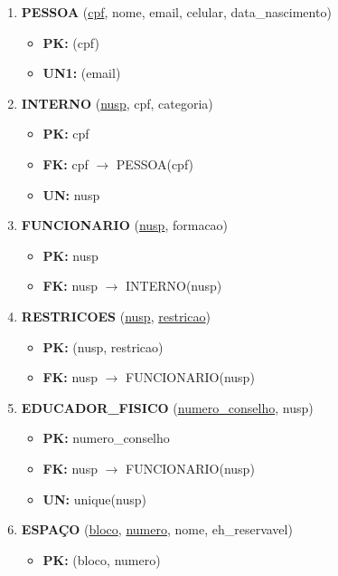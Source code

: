 \documentclass{article}
\begin{document}
\begin{enumerate}
    \item \textbf{PESSOA} (\underline{cpf}, nome, email, celular, data\_nascimento)
        \begin{itemize}
            \item \textbf{PK:} (cpf)
            \item \textbf{UN1:} (email)
        \end{itemize}

    \item \textbf{INTERNO} (\underline{nusp}, cpf, categoria)
        \begin{itemize}
            \item \textbf{PK:} cpf
            \item \textbf{FK:} cpf $\rightarrow$ PESSOA(cpf)
            \item \textbf{UN:} nusp
        \end{itemize}

    \item \textbf{FUNCIONARIO} (\underline{nusp}, formacao)
        \begin{itemize}
            \item \textbf{PK:} nusp
            \item \textbf{FK:} nusp $\rightarrow$ INTERNO(nusp)
        \end{itemize}
        
    \item \textbf{RESTRICOES} (\underline{nusp}, \underline{restricao})
        \begin{itemize}
            \item \textbf{PK:} (nusp, restricao)
            \item \textbf{FK:} nusp $\rightarrow$ FUNCIONARIO(nusp)
        \end{itemize}

    \item \textbf{EDUCADOR\_FISICO} (\underline{numero\_conselho}, nusp)
        \begin{itemize}
            \item \textbf{PK:} numero\_conselho
            \item \textbf{FK:} nusp $\rightarrow$ FUNCIONARIO(nusp)
            \item \textbf{UN:} unique(nusp)
        \end{itemize}

    \item \textbf{ESPAÇO} (\underline{bloco}, \underline{numero}, nome, eh\_reservavel)
        \begin{itemize}
            \item \textbf{PK:} (bloco, numero)
        \end{itemize}


\end{enumerate}
\end{document}
